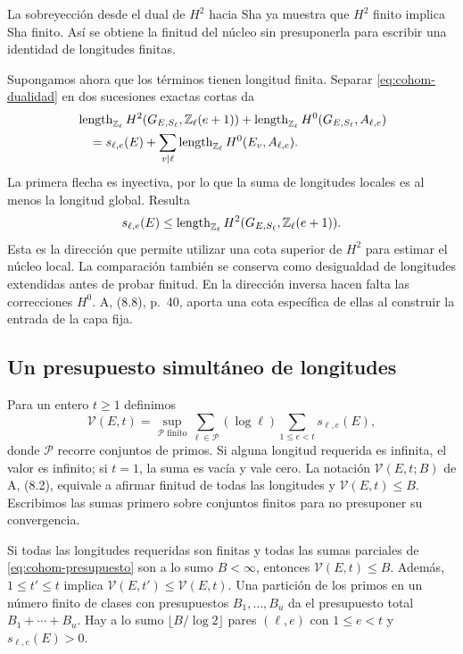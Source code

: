 La sobreyección desde el dual de $H^2$ hacia Sha
ya muestra que $H^2$ finito implica Sha finito.
Así se obtiene la finitud del núcleo sin presuponerla
para escribir una identidad de longitudes finitas.

Supongamos ahora que los términos tienen longitud finita.
Separar \eqref{eq:cohom-dualidad} en dos sucesiones
exactas cortas da
\begin{equation}
 \begin{aligned}
 &\operatorname{length}_{\mathbb{Z}_\ell}H^2(G_{E,S_\ell},\mathbb{Z}_\ell(e+1))
   +\operatorname{length}_{\mathbb{Z}_\ell}H^0(G_{E,S_\ell},A_{\ell,e})\\
 &\hspace{1em}=
 s_{\ell,e}(E)+
 \sum_{v\mid\ell}\operatorname{length}_{\mathbb{Z}_\ell}H^0(E_v,A_{\ell,e}).
 \end{aligned}
 \label{eq:cohom-longitudes-dualidad}
\end{equation}
La primera flecha es inyectiva, por lo que la suma
de longitudes locales es al menos la longitud global.
Resulta
\begin{equation}
 s_{\ell,e}(E)\le
 \operatorname{length}_{\mathbb{Z}_\ell}H^2(G_{E,S_\ell},\mathbb{Z}_\ell(e+1)).
 \label{eq:cohom-sha-le-hdos}
\end{equation}
Esta es la dirección que permite utilizar una cota
superior de $H^2$ para estimar el núcleo local.
La comparación también se conserva como desigualdad
de longitudes extendidas antes de probar finitud.
En la dirección inversa hacen falta las correcciones
$H^0$. A, (8.8), p.~40, aporta una cota específica de
ellas al construir la entrada de la capa fija.

\subsection{Un presupuesto simultáneo de longitudes}

Para un entero $t\ge1$ definimos
\begin{equation}
 \mathcal V(E,t)=
 \sup_{\mathcal P\text{ finito}}
 \sum_{\ell\in\mathcal P}(\log\ell)
       \sum_{1\le e<t}s_{\ell,e}(E),
 \label{eq:cohom-presupuesto}
\end{equation}
donde $\mathcal P$ recorre conjuntos de primos.
Si alguna longitud requerida es infinita, el valor es infinito;
si $t=1$, la suma es vacía y vale cero.
La notación $\mathcal V(E,t;B)$ de A, (8.2), equivale a
afirmar finitud de todas las longitudes y
$\mathcal V(E,t)\le B$.
Escribimos las sumas primero sobre conjuntos finitos para
no presuponer su convergencia.

\begin{lema}
\label{lem:cohom-presupuesto}
Si todas las longitudes requeridas son finitas y todas las
sumas parciales de \eqref{eq:cohom-presupuesto} son a lo
sumo $B<\infty$, entonces $\mathcal V(E,t)\le B$.
Además, $1\le t'\le t$ implica
$\mathcal V(E,t')\le\mathcal V(E,t)$.
Una partición de los primos en un número finito de clases
con presupuestos $B_1,\ldots,B_u$ da el presupuesto total
$B_1+\cdots+B_u$.
Hay a lo sumo $\lfloor B/\log2\rfloor$ pares $(\ell,e)$
con $1\le e<t$ y $s_{\ell,e}(E)>0$.
\end{lema}

